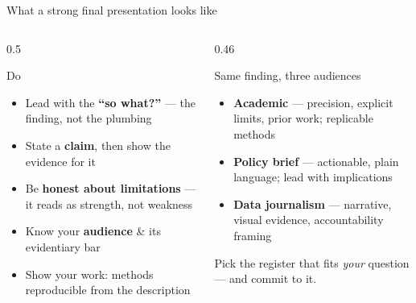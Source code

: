 \documentclass[9pt,aspectratio=169]{beamer}
\begin{document}
\begin{frame}{What a strong final presentation looks like}
    \begin{columns}[T]
        \begin{column}{0.5\textwidth}
            \begin{block}{Do}
                \footnotesize
                \begin{itemize}\footnotesize
                    \item Lead with the \textbf{``so what?''} --- the finding, not the plumbing
                    \item State a \textbf{claim}, then show the evidence for it
                    \item Be \textbf{honest about limitations} --- it reads as strength, not weakness
                    \item Know your \textbf{audience} \& its evidentiary bar
                    \item Show your work: methods reproducible from the description
                \end{itemize}
            \end{block}
        \end{column}
        \begin{column}{0.46\textwidth}
            \begin{block}{Same finding, three audiences}
                \footnotesize
                \begin{itemize}\footnotesize
                    \item \textbf{Academic} --- precision, explicit limits, prior work; replicable methods
                    \item \textbf{Policy brief} --- actionable, plain language; lead with implications
                    \item \textbf{Data journalism} --- narrative, visual evidence, accountability framing
                \end{itemize}
            \end{block}
            {\footnotesize Pick the register that fits \textit{your} question --- and commit to it.}
        \end{column}
    \end{columns}
\end{frame}
\end{document}
